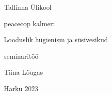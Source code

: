 \begin{titlepage}
\par{Tallinna Ülikool}
\vspace{0.3\textheight}
\par{peacecop kalmer:}
\LARGE
\par{Looduslik hügienism ja süsivesikud}
\normalsize
\par{seminaritöö}
\vspace{0.3\textheight}
\begin{flushright}
\par{Tiina Lõugas}
\end{flushright}
\vfill
Harku
\hfill
2023
\end{titlepage}
